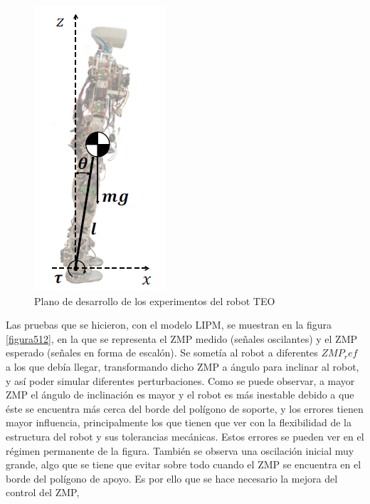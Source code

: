 \begin{figure}[H]
\centering
\includegraphics[scale=0.65]{imagenes/apartado_5/53_postura_inicial_experimental_teo}
\caption{Plano de desarrollo de los experimentos del robot TEO}
\label{figura511}
\end{figure}

Las pruebas que se hicieron, con el modelo LIPM, se muestran en la figura  \ref{figura512}, en la que se representa el ZMP medido (señales oscilantes) y el ZMP esperado (señales en forma de escalón). Se sometía al robot a diferentes $ZMP_ref$ a los que debía llegar, transformando dicho ZMP a ángulo para inclinar al robot, y así poder simular diferentes perturbaciones. Como se puede observar, a mayor ZMP el ángulo de inclinación es mayor y el robot es más inestable debido a que éste se encuentra más cerca del borde del polígono de soporte, y los errores tienen mayor influencia, principalmente los que tienen que ver con la flexibilidad de la estructura del robot y sus tolerancias mecánicas. Estos errores se pueden ver en el régimen permanente de la figura. También se observa una oscilación inicial muy grande, algo que se tiene que evitar sobre todo cuando el ZMP se encuentra en el borde del polígono de apoyo. Es por ello que se hace necesario la mejora del control del ZMP, 



